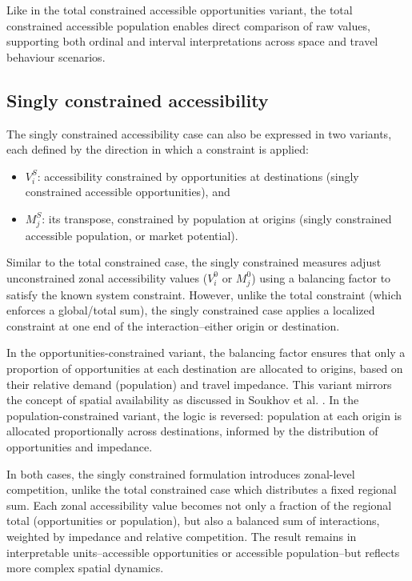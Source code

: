 \documentclass[
  10pt,
  letterpaper,
]{article}
\providecommand{\tightlist}{%
  \setlength{\itemsep}{0pt}\setlength{\parskip}{0pt}}
\begin{document}
Like in the total constrained accessible opportunities variant, the
total constrained accessible population enables direct comparison of raw
values, supporting both ordinal and interval interpretations across
space and travel behaviour scenarios.

\subsection{Singly constrained
accessibility}\label{singly-constrained-accessibility}

The singly constrained accessibility case can also be expressed in two
variants, each defined by the direction in which a constraint is
applied:

\begin{itemize}
\tightlist
\item
  \(V_i^S\): accessibility constrained by opportunities at destinations
  (singly constrained accessible opportunities), and
\item
  \(M_j^S\): its transpose, constrained by population at origins (singly
  constrained accessible population, or market potential).
\end{itemize}

Similar to the total constrained case, the singly constrained measures
adjust unconstrained zonal accessibility values (\(V_i^0\) or \(M_j^0\))
using a balancing factor to satisfy the known system constraint.
However, unlike the total constraint (which enforces a global/total
sum), the singly constrained case applies a localized constraint at one
end of the interaction--either origin or destination.

In the opportunities-constrained variant, the balancing factor ensures
that only a proportion of opportunities at each destination are
allocated to origins, based on their relative demand (population) and
travel impedance. This variant mirrors the concept of spatial
availability as discussed in Soukhov et al.
\citep{soukhovIntroducingSpatialAvailability2023}. In the
population-constrained variant, the logic is reversed: population at
each origin is allocated proportionally across destinations, informed by
the distribution of opportunities and impedance.

In both cases, the singly constrained formulation introduces zonal-level
competition, unlike the total constrained case which distributes a fixed
regional sum. Each zonal accessibility value becomes not only a fraction
of the regional total (opportunities or population), but also a balanced
sum of interactions, weighted by impedance and relative competition. The
result remains in interpretable units--accessible opportunities or
accessible population--but reflects more complex spatial dynamics.
\end{document}
